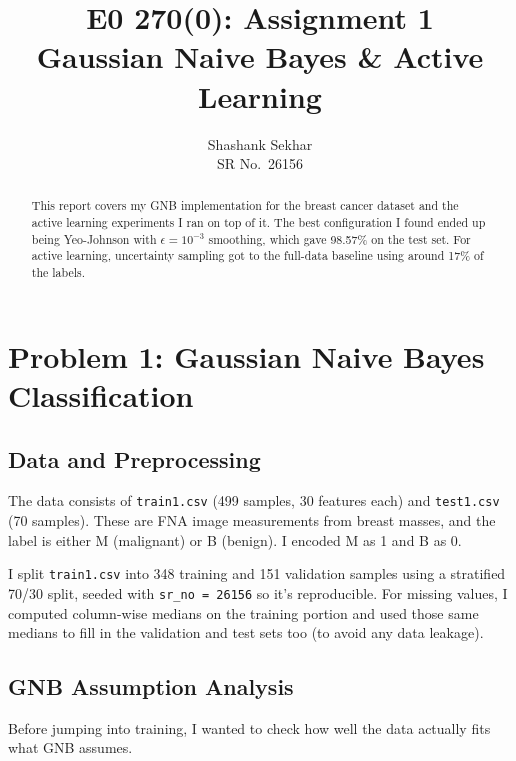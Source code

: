 \documentclass[journal,onecolumn]{IEEEtran}
\title{E0 270(0): Assignment 1 \\ Gaussian Naive Bayes \& Active Learning}
\author{Shashank Sekhar\\SR No.\ 26156}
\date{}
\begin{document}
\maketitle

\begin{abstract}
This report covers my GNB implementation for the breast cancer dataset and the active learning experiments I ran on top of it. The best configuration I found ended up being Yeo-Johnson with $\epsilon=10^{-3}$ smoothing, which gave 98.57\% on the test set. For active learning, uncertainty sampling got to the full-data baseline using around 17\% of the labels.
\end{abstract}

\section{Problem 1: Gaussian Naive Bayes Classification}

\subsection{Data and Preprocessing}

The data consists of \texttt{train1.csv} (499 samples, 30 features each) and \texttt{test1.csv} (70 samples). These are FNA image measurements from breast masses, and the label is either M (malignant) or B (benign). I encoded M as 1 and B as 0.

I split \texttt{train1.csv} into 348 training and 151 validation samples using a stratified 70/30 split, seeded with \texttt{sr\_no = 26156} so it's reproducible. For missing values, I computed column-wise medians on the training portion and used those same medians to fill in the validation and test sets too (to avoid any data leakage).

\subsection{GNB Assumption Analysis}

Before jumping into training, I wanted to check how well the data actually fits what GNB assumes.
\end{document}
